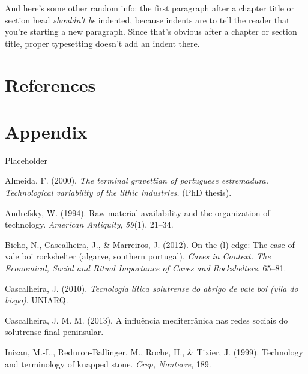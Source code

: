 \documentclass[12pt,twoside]{reedthesis}
\begin{document}
And here's some other random info: the first paragraph after a chapter title or section head \emph{shouldn't be} indented, because indents are to tell the reader that you're starting a new paragraph. Since that's obvious after a chapter or section title, proper typesetting doesn't add an indent there.

\hypertarget{references}{%
\chapter*{References}\label{references}}


\noindent

\setlength{\parindent}{-0.20in}
\setlength{\leftskip}{0.20in}
\setlength{\parskip}{8pt}

\hypertarget{appendix}{%
\chapter{Appendix}\label{appendix}}

Placeholder

\hypertarget{refs}{}
\leavevmode\hypertarget{ref-almeida2000}{}%
Almeida, F. (2000). \emph{The terminal gravettian of portuguese estremadura. Technological variability of the lithic industries.} (PhD thesis).

\leavevmode\hypertarget{ref-andrefsky1994}{}%
Andrefsky, W. (1994). Raw-material availability and the organization of technology. \emph{American Antiquity}, \emph{59}(1), 21--34.

\leavevmode\hypertarget{ref-bichoetal2012}{}%
Bicho, N., Cascalheira, J., \& Marreiros, J. (2012). On the (l) edge: The case of vale boi rockshelter (algarve, southern portugal). \emph{Caves in Context. The Economical, Social and Ritual Importance of Caves and Rockshelters}, 65--81.

\leavevmode\hypertarget{ref-cascalheira2010}{}%
Cascalheira, J. (2010). \emph{Tecnologia lítica solutrense do abrigo de vale boi (vila do bispo)}. UNIARQ.

\leavevmode\hypertarget{ref-cascalheira2013}{}%
Cascalheira, J. M. M. (2013). A influência mediterrânica nas redes sociais do solutrense final peninsular.

\leavevmode\hypertarget{ref-inizan1999}{}%
Inizan, M.-L., Reduron-Ballinger, M., Roche, H., \& Tixier, J. (1999). Technology and terminology of knapped stone. \emph{Crep, Nanterre}, 189.
\end{document}
